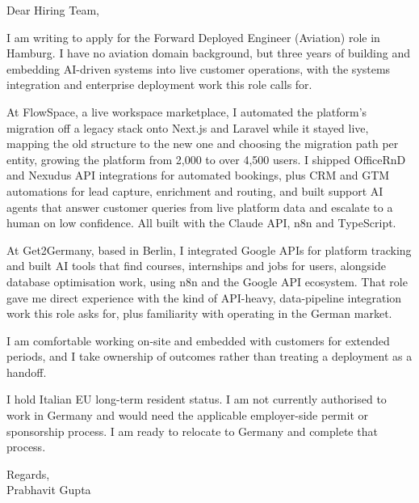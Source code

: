 \documentclass[a4paper,11pt]{article}
\begin{document}
Dear Hiring Team,

I am writing to apply for the Forward Deployed Engineer (Aviation) role in Hamburg. I have no aviation domain background, but three years of building and embedding AI-driven systems into live customer operations, with the systems integration and enterprise deployment work this role calls for.

At FlowSpace, a live workspace marketplace, I automated the platform's migration off a legacy stack onto Next.js and Laravel while it stayed live, mapping the old structure to the new one and choosing the migration path per entity, growing the platform from 2,000 to over 4,500 users. I shipped OfficeRnD and Nexudus API integrations for automated bookings, plus CRM and GTM automations for lead capture, enrichment and routing, and built support AI agents that answer customer queries from live platform data and escalate to a human on low confidence. All built with the Claude API, n8n and TypeScript.

At Get2Germany, based in Berlin, I integrated Google APIs for platform tracking and built AI tools that find courses, internships and jobs for users, alongside database optimisation work, using n8n and the Google API ecosystem. That role gave me direct experience with the kind of API-heavy, data-pipeline integration work this role asks for, plus familiarity with operating in the German market.

I am comfortable working on-site and embedded with customers for extended periods, and I take ownership of outcomes rather than treating a deployment as a handoff.

I hold Italian EU long-term resident status. I am not currently authorised to work in Germany and would need the applicable employer-side permit or sponsorship process. I am ready to relocate to Germany and complete that process.

Regards,\\
Prabhavit Gupta
\end{document}
